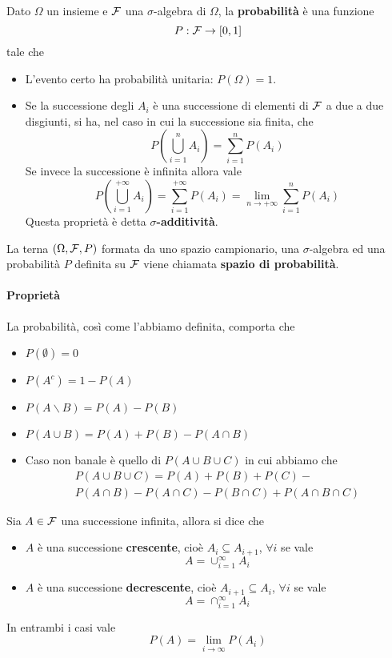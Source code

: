 \begin{definition}
	Dato $\Omega$ un insieme e $\mathcal{F}$ una $\sigma$-algebra di $\Omega$, la \textbf{probabilità} è
	una funzione
	\[ P : \mathcal{F} \to [0, 1] \]
	tale che
	\begin{itemize}
		\item L'evento certo ha probabilità unitaria: $P(\Omega) = 1$.
		\item Se la successione degli $A_i$ è una successione di elementi di $\mathcal{F}$ a due a due
		      disgiunti, si ha, nel caso in cui la successione sia finita, che
		      \[ P \left( \bigcup_{i=1}^n A_i \right) = \sum_{i=1}^n P(A_i) \]
		      Se invece la successione è infinita allora vale
		      \[
			      P \left( \bigcup_{i=1}^{+\infty} A_i \right) = \sum_{i=1}^{+\infty} P(A_i) =
			      \lim_{n \to +\infty} \sum_{i=1}^n P(A_i)
		      \]
		      Questa proprietà è detta $\sigma$\textbf{-additività}.
	\end{itemize}
\end{definition}

\begin{definition}
	La terna $(\Omega, \mathcal{F}, P)$ formata da uno spazio campionario, una $\sigma$-algebra ed una
	probabilità $P$ definita su $\mathcal{F}$ viene chiamata \textbf{spazio di probabilità}.
\end{definition}

\paragraph{Proprietà} La probabilità, così come l'abbiamo definita, comporta che
\begin{itemize}
	\item $P(\emptyset) = 0$
	\item $P(A^c) = 1 - P(A)$
	\item $P(A \backslash B) = P(A) - P(B)$
	\item $P(A \cup B) = P(A) + P(B) - P(A \cap B)$
	\item Caso non banale è quello di $P(A \cup B \cup C)$ in cui abbiamo che
	      \begin{multline*}
		      P(A \cup B \cup C) = P(A) + P(B) + P(C) - \\
		      P(A \cap B) - P(A \cap C) - P(B \cap C) + P(A \cap B \cap C)
	      \end{multline*}
\end{itemize}

\begin{proposition}
	Sia $A \in \mathcal{F}$ una successione infinita, allora si dice che
	\begin{itemize}
		\item $A$ è una successione \textbf{crescente}, cioè $A_i \subseteq A_{i+1}$, $\forall i$
		      se vale
		      \[ A = \cup_{i=1}^\infty A_i \]
		\item $A$ è una successione \textbf{decrescente}, cioè $A_{i+1} \subseteq A_i$,
		      $\forall i$ se vale
		      \[ A = \cap_{i=1}^\infty A_i \]
	\end{itemize}
	In entrambi i casi vale
	\[ P(A) = \lim_{i \to \infty} P(A_i) \]
\end{proposition}

